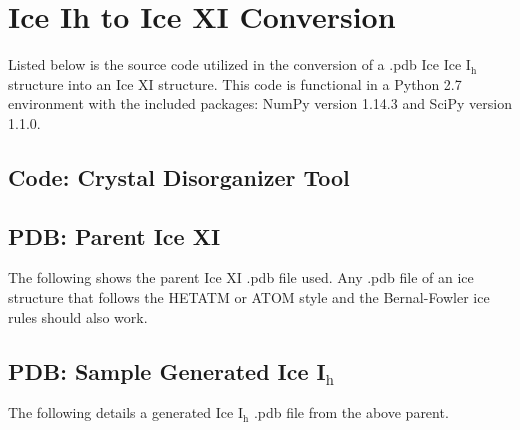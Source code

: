 \chapter{Ice Ih to Ice XI Conversion}
\label{ch:App:CrystalDisorg}

Listed below is the source code utilized in the conversion of a .pdb Ice Ice I$\mathrm{_{h}}$ structure into an Ice XI structure. This code is functional in a Python 2.7 environment with the included packages: NumPy version 1.14.3 and SciPy version 1.1.0.

\section{Code: Crystal Disorganizer Tool}


\section{PDB: Parent Ice XI}

The following shows the parent Ice XI .pdb file used. Any .pdb file of an ice structure that follows the HETATM or ATOM style and the Bernal-Fowler ice rules should also work.


\section{PDB: Sample Generated Ice I$\mathrm{_{h}}$}

The following details a generated Ice I$\mathrm{_{h}}$ .pdb file from the above parent.



%
%
%
%


